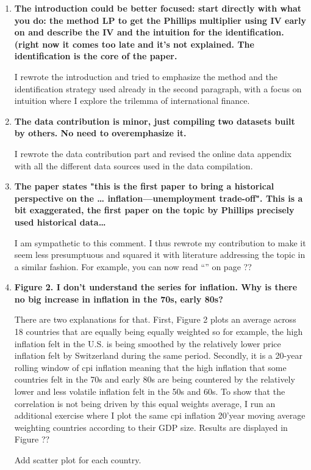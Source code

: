 \documentclass[12pt]{article}
\begin{document}
\begin{enumerate}
\item \textbf{The introduction could be better focused: start directly with what you do: the method LP to get the Phillips multiplier using IV early on and describe the IV and the intuition for the identification. (right now it comes too late and it's not explained. The identification is the core of the paper.}

I rewrote the introduction and tried to emphasize the method and the identification strategy used already in the second paragraph, with a focus on intuition where I explore the trilemma of international finance.

\item \textbf{The data contribution is minor, just compiling two datasets built by others. No need to overemphasize it.}

I rewrote the data contribution part and revised the online data appendix with all the different data sources used in the data compilation.

\item \textbf{The paper states "this is the first paper to bring a historical perspective on the … inflation—unemployment trade-off". This is a bit exaggerated, the first paper on the topic by Phillips precisely used historical data…}

I am sympathetic to this comment. I thus rewrote my contribution to make it seem less presumptuous and squared it with literature addressing the topic in a similar fashion. For example, you can now read “” on page ??

\item \textbf{Figure 2. I don't understand the series for inflation. Why is there no big increase in inflation in the 70s, early 80s?}

There are two explanations for that. First, Figure 2 plots an average across 18 countries that are equally being equally weighted so for example, the high inflation felt in the U.S. is being smoothed by the relatively lower price inflation felt by Switzerland during the same period. Secondly, it is a 20-year rolling window of cpi inflation meaning that the high inflation that some countries felt in the 70s and early 80s are being countered by the relatively lower and less volatile inflation felt in the 50s and 60s.
To show that the correlation is not being driven by this equal weights average, I run an additional exercise where I plot the same cpi inflation 20’year moving average weighting countries according to their GDP size. Results are displayed in Figure ??

Add scatter plot for each country.

\end{enumerate}
\end{document}
